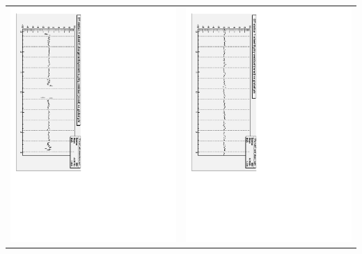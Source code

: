 \documentclass[compress]{beamer}
\begin{document}
\begin{frame}
\begin{tabular}{p{0.5\linewidth} p{0.5\linewidth}}
\vspace{0.01 cm} \includegraphics[height=\linewidth, angle=90]{possible_acoplanarity3.pdf} & 
\vspace{0.01 cm} \includegraphics[height=\linewidth, angle=90]{possible_acoplanarity_idealmc.pdf} \\
\end{tabular}

\end{frame}
\end{document}
